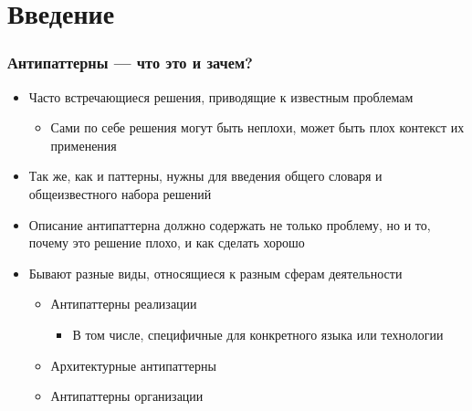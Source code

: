 \documentclass{../../slides-style}
\begin{document}
    
    \begin{frame}[plain]
        \titlepage
    \end{frame}

    \section{Введение}

    \begin{frame}
        \frametitle{Антипаттерны --- что это и зачем?}
        \begin{itemize}
            \item Часто встречающиеся решения, приводящие к известным проблемам
            \begin{itemize}
                \item Сами по себе решения могут быть неплохи, может быть плох контекст их применения
            \end{itemize}
            \item Так же, как и паттерны, нужны для введения общего словаря и общеизвестного набора решений
            \item Описание антипаттерна должно содержать не только проблему, но и то, почему это решение плохо, и как сделать хорошо
            \item Бывают разные виды, относящиеся к разным сферам деятельности
            \begin{itemize}
                \item Антипаттерны реализации
                \begin{itemize}
                    \item В том числе, специфичные для конкретного языка или технологии
                \end{itemize}
                \item Архитектурные антипаттерны
                \item Антипаттерны организации
            \end{itemize}
        \end{itemize}
    \end{frame}
\end{document}
